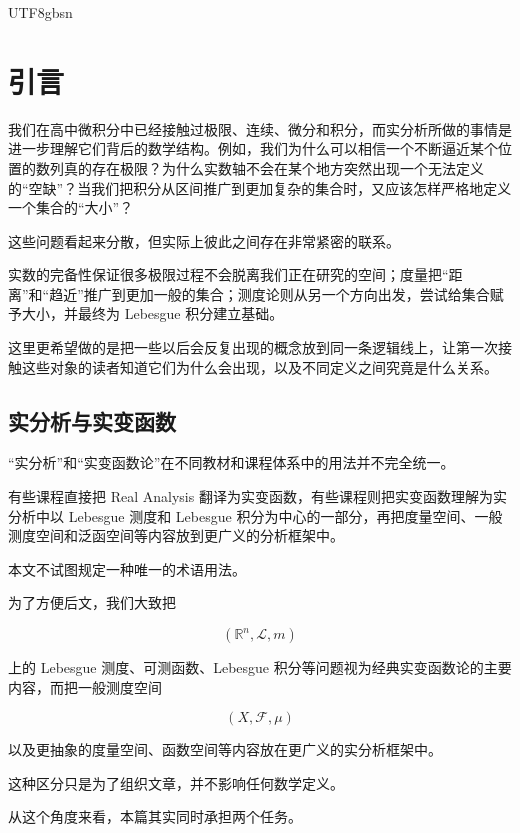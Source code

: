 \documentclass[11pt]{article}
\begin{document}
\begin{CJK*}{UTF8}{gbsn}

\maketitle

\section*{引言}

我们在高中微积分中已经接触过极限、连续、微分和积分，而实分析所做的事情是进一步理解它们背后的数学结构。例如，我们为什么可以相信一个不断逼近某个位置的数列真的存在极限？为什么实数轴不会在某个地方突然出现一个无法定义的“空缺”？当我们把积分从区间推广到更加复杂的集合时，又应该怎样严格地定义一个集合的“大小”？

这些问题看起来分散，但实际上彼此之间存在非常紧密的联系。

实数的完备性保证很多极限过程不会脱离我们正在研究的空间；度量把“距离”和“趋近”推广到更加一般的集合；测度论则从另一个方向出发，尝试给集合赋予大小，并最终为 Lebesgue 积分建立基础。

这里更希望做的是把一些以后会反复出现的概念放到同一条逻辑线上，让第一次接触这些对象的读者知道它们为什么会出现，以及不同定义之间究竟是什么关系。

\subsection*{实分析与实变函数}

“实分析”和“实变函数论”在不同教材和课程体系中的用法并不完全统一。

有些课程直接把 Real Analysis 翻译为实变函数，有些课程则把实变函数理解为实分析中以 Lebesgue 测度和 Lebesgue 积分为中心的一部分，再把度量空间、一般测度空间和泛函空间等内容放到更广义的分析框架中。

本文不试图规定一种唯一的术语用法。

为了方便后文，我们大致把

\[
(\mathbb{R}^{n},\mathcal{L},m)
\]

上的 Lebesgue 测度、可测函数、Lebesgue 积分等问题视为经典实变函数论的主要内容，而把一般测度空间

\[
(X,\mathcal{F},\mu)
\]

以及更抽象的度量空间、函数空间等内容放在更广义的实分析框架中。

这种区分只是为了组织文章，并不影响任何数学定义。

从这个角度来看，本篇其实同时承担两个任务。


\end{CJK*}
\end{document}
